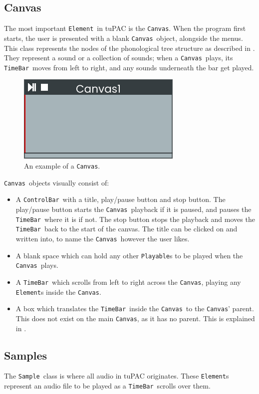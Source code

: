 \documentclass[12pt,a4paper,oneside,openright]{report}
\newcommand{\element}{\texttt{Element}}
\newcommand{\canvas}{\texttt{Canvas}}
\newcommand{\controlbar}{\texttt{ControlBar}}
\newcommand{\timebar}{\texttt{TimeBar}}
\newcommand{\playable}{\texttt{Playable}}
\newcommand{\sample}{\texttt{Sample}}
\begin{document}
\subsection{Canvas}\label{sec:canvas}
The most important \element\ in tuPAC is the \canvas. When the program first starts, the user is presented with a blank \canvas\ object, alongside the menus. This class represents the nodes of the phonological tree structure as described in . They represent a sound or a collection of sounds; when a \canvas\ plays, its \timebar\ moves from left to right, and any sounds underneath the bar get played.

\begin{figure}[h]
    \centering
    \includegraphics{images/canvas.png}
    \caption{An example of a \canvas.}
    \label{fig:canvas}
\end{figure}
\newpage
\canvas\ objects visually consist of:
\begin{itemize}
    \item A \controlbar\ with a title, play/pause button and stop button. The play/pause button starts the \canvas\ playback if it is paused, and pauses the \timebar\ where it is if not. The stop button stops the playback and moves the \timebar\ back to the start of the canvas. The title can be clicked on and written into, to name the \canvas\ however the user likes.
    \item A blank space which can hold any other \playable s to be played when the \canvas\ plays.
    \item A \timebar\ which scrolls from left to right across the \canvas, playing any \element s inside the \canvas.
    \item A box which translates the \timebar\ inside the \canvas\ to the \canvas' parent. This does not exist on the main \canvas, as it has no parent. This is explained in .
\end{itemize}

\subsection{Samples}
The \sample\ class is where all audio in tuPAC originates. These \element s represent an audio file to be played as a \timebar\ scrolls over them.
\end{document}
